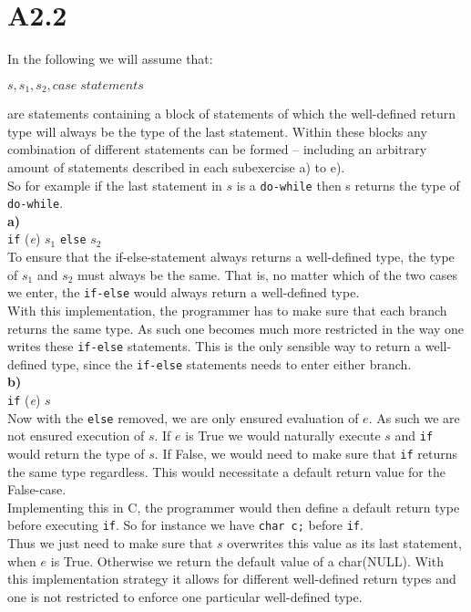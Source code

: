 \newpage
\section*{A2.2}
In the following we will assume that:
\begin{center}
  $s,s_1,s_2, case\; statements$
\end{center}
are statements containing a block of statements of which the well-defined return type will always be the type of the last statement. Within these blocks any combination of different statements can be formed -- including an arbitrary amount of statements described in each subexercise a) to e).\\
So for example if the last statement in $s$ is a \texttt{do-while} then s returns the type of \texttt{do-while}.  \\

\textbf{a)}\\
\texttt{if} (\textit{e}) $s_1$ \texttt{else} $s_2$\\
To ensure that the if-else-statement always returns a well-defined type, the type of $s_1$ and $s_2$ must always be the same. That is, no matter which of the two cases we enter, the \texttt{if-else} would always return a well-defined type.\\
With this implementation, the programmer has to make sure that each branch returns the same type. As such one becomes much more restricted in the way one writes these \texttt{if-else} statements. This is the only sensible way to return a well-defined type, since the \texttt{if-else} statements needs to enter either branch.\\

\textbf{b)}\\
\texttt{if} (\textit{e}) $s$\\
Now with the \texttt{else} removed, we are only ensured evaluation of $e$. As such we are not ensured execution of $s$. If $e$ is True we would naturally execute $s$ and \texttt{if} would return the type of $s$. If False, we would need to make sure that \texttt{if} returns the same type regardless. This would necessitate a default return value for the False-case.\\

Implementing this in C, the programmer would then define a default return type before executing \texttt{if}. So for instance we have \texttt{char c;} before \texttt{if}.\\
Thus we just need to make sure that $s$ overwrites this value as its last statement, when $e$ is True. Otherwise we return the default value of a char(NULL). With this implementation strategy it allows for different well-defined return types and one is not restricted to enforce one particular well-defined type.\\


